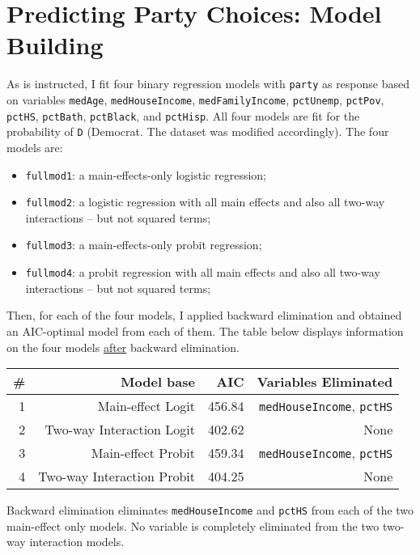 \documentclass[12pt,a4paper]{article}
\begin{document}
\section{Predicting Party Choices: Model Building}


As is instructed, I fit four binary regression models with \texttt{party} as response based on variables \texttt{medAge}, \texttt{medHouseIncome}, \texttt{medFamilyIncome}, \texttt{pctUnemp}, \texttt{pctPov}, \texttt{pctHS}, \texttt{pctBath}, \texttt{pctBlack}, and \texttt{pctHisp}. All four models are fit for the probability of \texttt{D} (Democrat. The dataset was modified accordingly). The four models are:

\begin{itemize}
	\item \texttt{fullmod1}: a main-effects-only logistic regression;
	\item \texttt{fullmod2}: a logistic regression with all main effects and also all two-way interactions -- but not squared terms;
	\item \texttt{fullmod3}: a main-effects-only probit regression;
	\item \texttt{fullmod4}: a probit regression with all main effects and also all two-way interactions -- but not squared terms;
\end{itemize}

Then, for each of the four models, I applied backward elimination and obtained an AIC-optimal model from each of them. The table below displays information on the four models \underline{after} backward elimination.


\begin{center}
	
	\begin{tabular}{r|rrr}
		\# & Model base & AIC & Variables Eliminated \\ \hline
		1 & Main-effect Logit &456.84 & \texttt{medHouseIncome}, \texttt{pctHS}  \\
		2 & Two-way Interaction Logit &402.62 & None\\
		3 & Main-effect Probit &459.34 & \texttt{medHouseIncome}, \texttt{pctHS}   \\
		4 &  Two-way Interaction Probit &404.25& None
		
	\end{tabular}



\end{center}

Backward elimination eliminates \texttt{medHouseIncome} and \texttt{pctHS} from each of the two main-effect only models. No variable is completely eliminated from the two two-way interaction models. 
\end{document}
